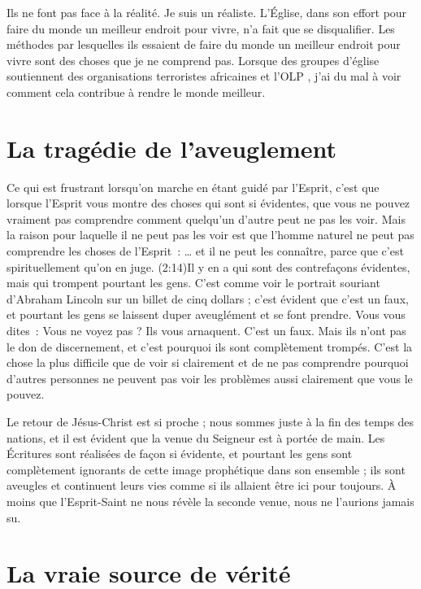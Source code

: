 Ils ne font pas face à la réalité. Je suis un réaliste.
 L'Église, dans son effort pour faire du monde un meilleur endroit
 pour vivre, n'a fait que se disqualifier.
 Les méthodes par lesquelles ils essaient de faire du monde un meilleur
 endroit pour vivre sont des choses que je ne comprend pas. 
 Lorsque des groupes d'église soutiennent des organisations terroristes
 africaines et l'OLP ,
 j'ai du mal à voir comment cela contribue à rendre le monde meilleur.

\section*{La tragédie de l'aveuglement}

Ce qui est frustrant lorsqu'on marche en étant guidé par l'Esprit,
 c'est que lorsque l'Esprit vous montre des choses qui sont si évidentes,
 que vous ne pouvez vraiment pas comprendre comment quelqu'un d'autre
 peut ne pas les voir. Mais la raison pour laquelle il ne peut pas les voir
 est que l'homme naturel ne peut pas comprendre les choses de l'Esprit~:
 \og \dots{} et il ne peut les connaître, parce que c'est spirituellement
 qu'on en juge. \fg{}
 (2:14)Il y en a qui sont des contrefaçons évidentes,
 mais qui trompent pourtant
 les gens. C'est comme voir le portrait souriant d'Abraham Lincoln
 sur un billet de cinq dollars ; c'est évident que c'est un faux,
 et pourtant les gens se laissent duper aveuglément et se font prendre.
 Vous vous dites~: \og Vous ne voyez pas ? Ils vous arnaquent.
 C'est un faux. \fg{}
 Mais ils n'ont pas le don de discernement, et c'est pourquoi ils sont
 complètement trompés.
 C'est la chose la plus difficile que de voir si clairement et de ne pas
 comprendre pourquoi d'autres personnes ne peuvent pas voir les problèmes
 aussi clairement que vous le pouvez.

Le retour de Jésus-Christ est si proche ; nous sommes juste à la fin
 des temps des nations, et il est évident que la venue du Seigneur
 est à portée de main. Les Écritures sont réalisées de façon si évidente,
 et pourtant les gens sont complètement ignorants de cette image prophétique
 dans son ensemble ; ils sont aveugles et continuent leurs vies
 comme si ils allaient être ici pour toujours.
 À moins que l'Esprit-Saint ne nous révèle la seconde venue,
 nous ne l'aurions jamais su.


\section*{La vraie source de vérité}

